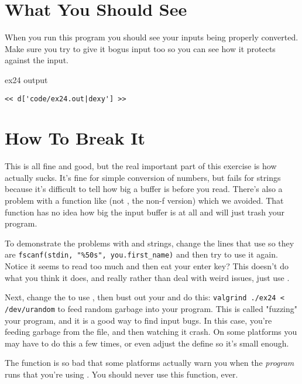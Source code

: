 \section{What You Should See}

When you run this program you should see your inputs being properly converted.
Make sure you try to give it bogus input too so you can see how it protects
against the input.

\begin{code}{ex24 output}
\begin{lstlisting}
<< d['code/ex24.out|dexy'] >>
\end{lstlisting}
\end{code}


\section{How To Break It}

This is all fine and good, but the real important part of this exercise is
how  actually sucks.  It's fine for simple conversion of numbers,
but fails for strings because it's difficult to tell  how big a buffer
is before you read.  There's also a problem with a function like 
(not , the non-f version) which we avoided.  That function has
no idea how big the input buffer is at all and will just trash your program.

To demonstrate the problems with  and strings, change the lines
that use  so they are \verb|fscanf(stdin, "%50s", you.first_name)|
and then try to use it again.  Notice it seems to read too much and then 
eat your enter key?  This doesn't do what you think it does, and really
rather than deal with weird  issues, just use .

Next, change the  to use , then bust out your
 and do this:  \verb|valgrind ./ex24 < /dev/urandom|
to feed random garbage into your program.  This is called "fuzzing"
your program, and it is a good way to find input bugs.  In this case,
you're feeding garbage from the  file, and then watching
it crash.  On some platforms you may have to do this a few times, or even
adjust the  define so it's small enough.

The  function is so bad that some platforms actually warn you
when the \emph{program} runs that you're using .  You should
never use this function, ever.

